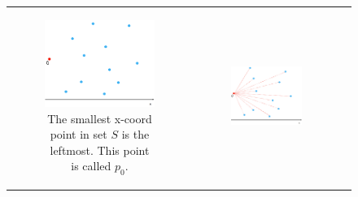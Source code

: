 \documentclass [12pt]{article}
\begin{document}
\begin{enumerate}[label=(\alph*)]
        \begin{figure}[h] 
            \begin{tabular}{ccc}
                \begin{subfigure}{0.33\textwidth}
                    \centering
                    \includegraphics[width=1\textwidth]{images/star1.PNG}
                    \caption{The smallest x-coord point in set $S$ is the leftmost. This point is called $p_0$.}
                    \label{fig:star1}
                \end{subfigure} &
                \begin{subfigure}{0.33\textwidth}
                    \centering
                    \includegraphics[width=1\textwidth]{images/star2.PNG}

\end{subfigure}
\end{tabular}
\end{figure}
\end{enumerate}
\end{document}
